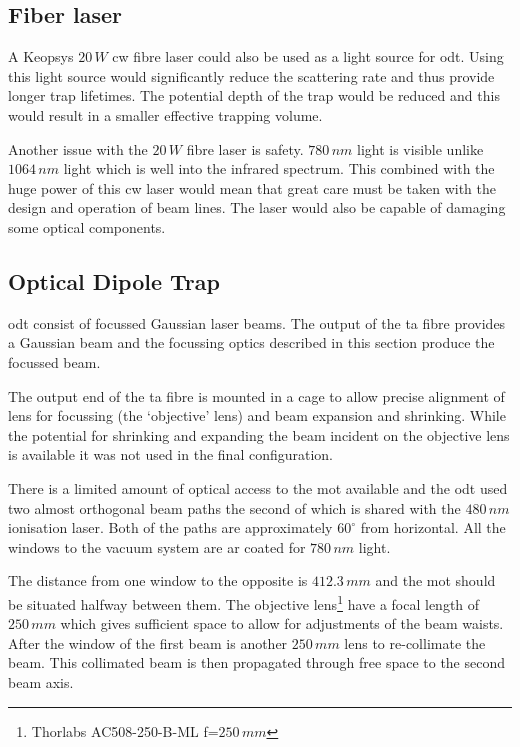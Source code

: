 \subsection{Fiber laser}

A Keopsys $20\,\unit{W}$ \gls{cw} fibre laser could also be used as a light source for \gls{odt}. Using this light source would significantly reduce the scattering rate and thus provide longer trap lifetimes. The potential depth of the trap would be reduced and this would result in a smaller effective trapping volume.

Another issue with the $20\,\unit{W}$ fibre laser is safety. $780\,\unit{nm}$ light is visible unlike $1064\,\unit{nm}$ light which is well into the infrared spectrum. This combined with the huge power of this \gls{cw} laser would mean that great care must be taken with the design and operation of beam lines. The laser would also be capable of damaging some optical components.


\subsection{Optical Dipole Trap}

\Gls{odt} consist of focussed Gaussian laser beams. The output of the \gls{ta} fibre provides a Gaussian beam and the focussing optics described in this section produce the focussed beam.

The output end of the \gls{ta} fibre is mounted in a cage to allow precise alignment of lens for focussing (the `objective' lens) and beam expansion and shrinking. While the potential for shrinking and expanding the beam incident on the objective lens is available it was not used in the final configuration.

There is a limited amount of optical access to the \gls{mot} available and the \gls{odt} used two almost orthogonal beam paths the second of which is shared with the $480\,\unit{nm}$ ionisation laser. Both of the paths are approximately $60^{\circ}$ from horizontal. All the windows to the vacuum system are \gls{ar} coated for $780\,\unit{nm}$ light.

The distance from one window to the opposite is $412.3\,\unit{mm}$ and the \gls{mot} should be situated halfway between them. The objective lens\footnote{Thorlabs AC508-250-B-ML f=$250\,\unit{mm}$} have a focal length of $250\,\unit{mm}$ which gives sufficient space to allow for adjustments of the beam waists. After the window of the first beam is another $250\,\unit{mm}$ lens to re-collimate the beam. This collimated beam is then propagated through free space to the second beam axis.

